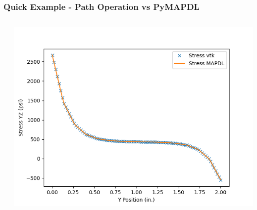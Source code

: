 \documentclass[t]{beamer}
\begin{document}
\begin{frame}
  \frametitle{Quick Example - Path Operation vs PyMAPDL}

  \begin{columns}[T]
    \begin{column}{.5\textwidth}
      \vspace{-15pt}
      \inputminted[fontsize=\footnotesize]{python}{code/path_op_vs_pymapdl.py}
    \end{column}

    \begin{column}{.5\textwidth}
      \vspace{-15pt}
      \centering
      \includegraphics[width=1.0\textwidth]{figures/path_op_vs_pymapdl.png}
    \end{column}
  \end{columns}

\end{frame}


\end{document}
